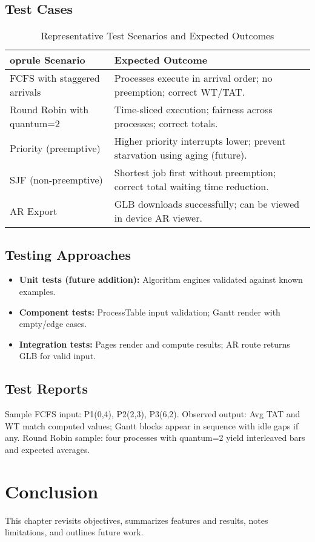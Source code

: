 \documentclass[12pt,a4paper,oneside]{report}
\begin{document}
\section{Test Cases}
\begin{longtable}{p{} p{}}
\caption{Representative Test Scenarios and Expected Outcomes}\\
	oprule
Scenario & Expected Outcome \\
\midrule
FCFS with staggered arrivals & Processes execute in arrival order; no preemption; correct WT/TAT. \\
Round Robin with quantum=2 & Time-sliced execution; fairness across processes; correct totals. \\
Priority (preemptive) & Higher priority interrupts lower; prevent starvation using aging (future). \\
SJF (non-preemptive) & Shortest job first without preemption; correct total waiting time reduction. \\
AR Export & GLB downloads successfully; can be viewed in device AR viewer. \\
\bottomrule
\end{longtable}

\section{Testing Approaches}
\begin{itemize}
  \item \textbf{Unit tests (future addition):} Algorithm engines validated against known examples.
  \item \textbf{Component tests:} ProcessTable input validation; Gantt render with empty/edge cases.
  \item \textbf{Integration tests:} Pages render and compute results; AR route returns GLB for valid input.
\end{itemize}

\section{Test Reports}
Sample FCFS input: P1(0,4), P2(2,3), P3(6,2). Observed output: Avg TAT and WT match computed values; Gantt blocks appear in sequence with idle gaps if any. Round Robin sample: four processes with quantum=2 yield interleaved bars and expected averages.

\chapter{Conclusion}
\noindent This chapter revisits objectives, summarizes features and results, notes limitations, and outlines future work.
\end{document}
